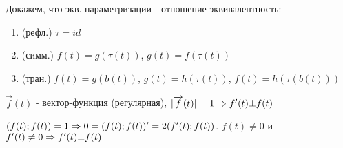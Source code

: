 \documentclass[11pt]{article}
\begin{document}
Докажем, что экв. параметризации - отношение эквивалентность:
\begin{enumerate}
    \item (рефл.) $\tau=id$
    \item (симм.) $f(t)=g(\tau(t))$, $g(t)=f(\tau(t))$
    \item (тран.) $f(t)=g(b(t))$, $g(t)=h(\tau(t))$, $f(t)=h(\tau(b(t)))$
\end{enumerate}

\begin{lemma}
    $\overrightarrow{f}(t)$ - вектор-функция (регулярная), $|\overrightarrow{f}(t)|=1 \Rightarrow f'(t) \bot f(t)$
\end{lemma}

\begin{proofs}
    $(f(t);f(t))=1 \Rightarrow 0=(f(t);f(t))'=2(f'(t);f(t))$. $f(t) \neq 0$ и $f'(t) \neq 0 \Rightarrow f'(t) \bot f(t)$
\end{proofs}
\end{document}

